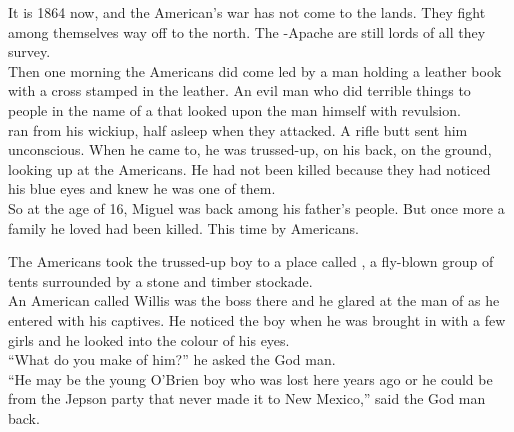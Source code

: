 


It is 1864 now, and the American's war has not come to the  lands. They fight among themselves way off to the north. The -Apache are still lords of all they survey. \\

Then one morning the Americans did come led by a man holding a leather book with a cross stamped in the leather. An evil man who did terrible things to people in the name of a  that looked upon the man himself with revulsion. \\

 ran from his wickiup, half asleep when they attacked. A rifle butt sent him unconscious. When he came to, he was trussed-up, on his back, on the ground, looking up at the Americans. He had not been killed because they had noticed his blue eyes and knew he was one of them. \\

So at the age of 16, Miguel was back among his father's people. But once more a family he loved had been killed. This time by Americans. \\





The Americans took the trussed-up boy to a place called , a fly-blown group of tents surrounded by a stone and timber stockade. \\

An American called Willis was the boss there and he glared at the man of  as he entered with his captives. He noticed the boy when he was brought in with a few  girls and he looked into the colour of his eyes. \\

``What do you make of him?'' he asked the God man. \\
``He may be the young O'Brien boy who was lost here years ago or he could be from the Jepson party that never made it to New Mexico,'' said the God man back. \\

